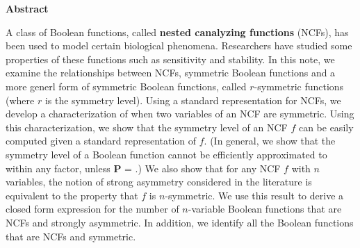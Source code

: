 \vspace*{-0.05in}
\begin{center}
\textbf{Abstract}  %
\end{center}

\smallskip

A class of Boolean functions, 
called \textbf{nested canalyzing functions} (NCFs),
has been used to model certain biological phenomena.
Researchers have studied some properties of these functions
such as sensitivity and stability.
In this note, we examine the relationships between NCFs, symmetric 
Boolean functions and a more generl form of symmetric Boolean functions,
called $r$-symmetric functions (where $r$ is the symmetry level).
Using a standard representation for NCFs, we develop a 
characterization of when two variables of an NCF are symmetric.
Using this characterization, we show 
that the symmetry level of an NCF $f$
can be easily computed given a standard representation of $f$.
(In general, we show that the symmetry level of
a Boolean function cannot be efficiently approximated
to within any factor, unless \textbf{P} = \cnp.)
We also show that for any NCF $f$ with $n$ variables, the notion of
strong asymmetry considered in the literature is equivalent to
the property that $f$ is $n$-symmetric. 
We use this result to derive a closed form expression for the
number of $n$-variable Boolean functions 
that are NCFs and strongly asymmetric.
In addition, we identify all the Boolean functions that are NCFs 
and symmetric. 
